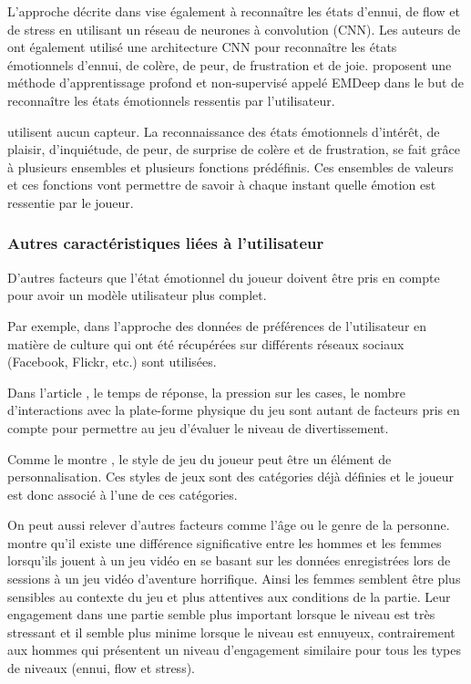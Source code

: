 \documentclass[11pt]{article}
\begin{document}
            L'approche décrite dans \cite{maier_et_al._2019} vise également à reconnaître les états d'ennui, de flow et de stress en utilisant un réseau de neurones à convolution (CNN). 
            Les auteurs de \cite{yang_et_al._2018} ont également utilisé une architecture CNN pour reconnaître les états émotionnels d'ennui, de colère, de peur, de frustration et de joie. 
            \cite{gal_2019,gal_et_al._2020} proposent une méthode d'apprentissage profond et non-supervisé appelé EMDeep dans le but de reconnaître les états émotionnels ressentis par l'utilisateur.\par
            \cite{Mostefai_et_al._2019} utilisent aucun capteur. La reconnaissance des états émotionnels d'intérêt, de plaisir, d'inquiétude, de peur, de surprise de colère et de frustration, se fait grâce à plusieurs ensembles et plusieurs fonctions prédéfinis. Ces ensembles de valeurs et ces fonctions vont permettre de savoir à chaque instant quelle émotion est ressentie par le joueur.
	    \subsubsection{Autres caractéristiques liées à l'utilisateur} \label{sec:caractéristiques}
	        D’autres facteurs que l’état émotionnel du joueur doivent être pris en compte pour avoir un modèle utilisateur plus complet.\par
	        Par exemple, dans l'approche \cite{noor_et_al._2009} des données de préférences de l’utilisateur en matière de culture qui ont été récupérées sur différents réseaux sociaux (Facebook, Flickr, etc.) sont utilisées.\par
	        Dans l’article \cite{yannakakis_et_al._2009}, le temps de réponse, la pression sur les cases, le nombre d’interactions avec la plate-forme physique du jeu sont autant de facteurs pris en compte pour permettre au jeu d'évaluer le niveau de divertissement.\par
	        Comme le montre \cite{Mostefai_et_al._2019}, le style de jeu du joueur peut être un élément de personnalisation. 
	        Ces styles de jeux sont des catégories déjà définies et le joueur est donc associé à l'une de ces catégories.\par
	        On peut aussi relever d’autres facteurs comme l’âge ou le genre de la personne. \cite{carofiglio_et_al._2019} montre qu'il existe une différence significative entre les hommes et les femmes lorsqu’ils jouent à un jeu vidéo en se basant sur les données enregistrées lors de sessions à un jeu vidéo d’aventure horrifique. 
	        Ainsi les femmes semblent être plus sensibles au contexte du jeu et plus attentives aux conditions de la partie. 
	        Leur engagement dans une partie semble plus important lorsque le niveau est très stressant et il semble plus minime lorsque le niveau est ennuyeux, contrairement aux hommes qui présentent un niveau d’engagement similaire  pour tous les types de niveaux (ennui, flow et stress).
\end{document}
